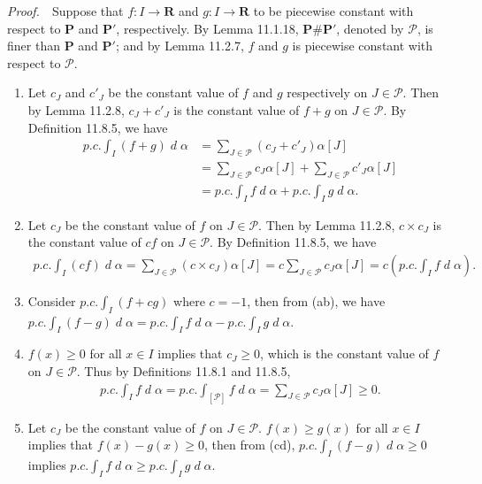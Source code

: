 \documentclass{book}
\DeclareMathOperator{\dd}{\mathit{d}}
\newcommand{\pff}{\vspace{.25em}\noindent\emph{Proof.}~~}
\begin{document}
    \pff Suppose that $f:I\to\mathbf{R}$ and $g:I\to\mathbf{R}$ to be piecewise constant with respect to $\mathbf{P}$ and $\mathbf{P'}$, respectively. By Lemma 11.1.18, $\mathbf{P}\#\mathbf{P'}$, denoted by $\mathcal{P}$, is finer than $\mathbf{P}$ and $\mathbf{P'}$; and by Lemma 11.2.7, $f$ and $g$ is piecewise constant with respect to $\mathcal{P}$.
    \begin{enumerate}
        \item Let $c_{J}$ and $c'_J$ be the constant value of $f$ and $g$ respectively on $J\in\mathcal{P}$. Then by Lemma 11.2.8, $c_J+c'_J$ is the constant value of $f+g$ on $J\in\mathcal{P}$. By Definition 11.8.5, we have
            \begin{align*}
                p.c.\int_{I} (f + g) \dd\alpha
                &=\sum_{J \in \mathcal{P}} (c_J + c'_J)\alpha[J]\\
                &=\sum_{J \in \mathcal{P}} c_J\alpha[J] + \sum_{J\in\mathcal{P}} c'_J\alpha[J]\\
                &=p.c.\int_{I} f  \dd\alpha + p.c.\int_{I} g \dd\alpha.
            \end{align*}
        \item Let $c_J$ be the constant value of $f$ on $J\in\mathcal{P}$. Then by Lemma 11.2.8, $c\times c_J$ is the constant value of $cf$ on $J\in\mathcal{P}$. By Definition 11.8.5, we have
            \begin{align*}
                p.c.\int_{I} (cf) \dd\alpha
                = \sum_{J\in\mathcal{P}} (c \times c_J)\alpha[J]
                = c \sum_{J \in \mathcal{P}} c_J\alpha[J]
                = c \left(p.c.\int_{I} f \dd\alpha\right).
            \end{align*}
        \item Consider $p.c.\int_{I} (f + cg)$ where $c = -1$, then from (ab), we have $p.c.\int_{I} (f - g) \dd\alpha = p.c.\int_{I} f \dd\alpha - p.c.\int_{I} g \dd\alpha$.
        \item $f(x)\geq 0$ for all $x\in I$ implies that $c_J\geq 0$, which is the constant value of $f$ on $J\in\mathcal{P}$. Thus by Definitions 11.8.1 and 11.8.5,
            \begin{align*}
                p.c.\int_{I} f \dd\alpha
                = p.c.\int_{[\mathcal{P}]} f \dd\alpha
                = \sum_{J\in\mathcal{P}} c_J\alpha[J] \geq 0.
            \end{align*}
        \item Let $c_J$ be the constant value of $f$ on $J \in \mathcal{P}$. $f(x) \geq g(x)$ for all $x \in I$ implies that $f(x) - g(x) \geq 0$, then from (cd), $p.c.\int_{I} (f - g) \dd\alpha \geq 0$ implies $p.c.\int_{I} f \dd\alpha \geq p.c.\int_{I} g \dd\alpha$.

\end{enumerate}
\end{document}
